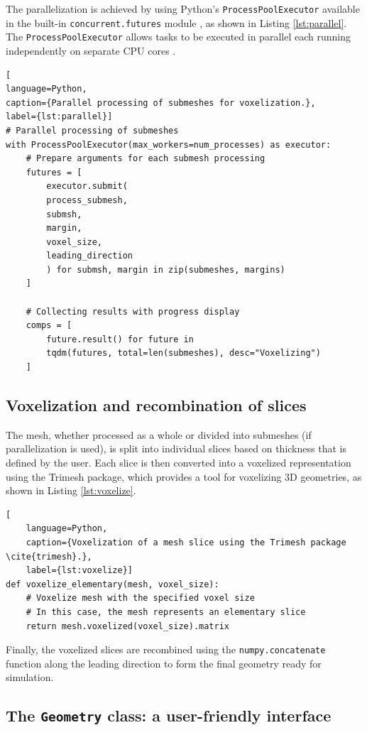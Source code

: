The parallelization is achieved by using Python’s \texttt{ProcessPoolExecutor} available in the built-in \texttt{concurrent.futures} module \cite{concurrent-futures}, as shown in Listing \ref{lst:parallel}. The \texttt{ProcessPoolExecutor} allows tasks to be executed in parallel each running independently on separate CPU cores \cite{concurrent-futures}.

\begin{lstlisting}[
language=Python,
caption={Parallel processing of submeshes for voxelization.},
label={lst:parallel}]
# Parallel processing of submeshes
with ProcessPoolExecutor(max_workers=num_processes) as executor:
	# Prepare arguments for each submesh processing
	futures = [
		executor.submit(
		process_submesh,
		submsh,
		margin,
		voxel_size,
		leading_direction
		) for submsh, margin in zip(submeshes, margins)
	]
	
	# Collecting results with progress display
	comps = [
		future.result() for future in 
		tqdm(futures, total=len(submeshes), desc="Voxelizing")
	]
\end{lstlisting}

\subsection{Voxelization and recombination of slices}\label{voxelizing and recombining}

The mesh, whether processed as a whole or divided into submeshes (if parallelization is used), is split into individual slices based on thickness that is defined by the user. Each slice is then converted into a voxelized representation using the Trimesh package, which provides a tool for voxelizing 3D geometries, as shown in Listing \ref{lst:voxelize}.

\begin{lstlisting}[
	language=Python,
	caption={Voxelization of a mesh slice using the Trimesh package \cite{trimesh}.},
	label={lst:voxelize}]
def voxelize_elementary(mesh, voxel_size):
	# Voxelize mesh with the specified voxel size
	# In this case, the mesh represents an elementary slice
	return mesh.voxelized(voxel_size).matrix
\end{lstlisting}

Finally, the voxelized slices are recombined using the \texttt{numpy.concatenate} function \cite{numpy} along the leading direction to form the final geometry ready for simulation.


\subsection{The \texttt{Geometry} class: a user-friendly interface}

